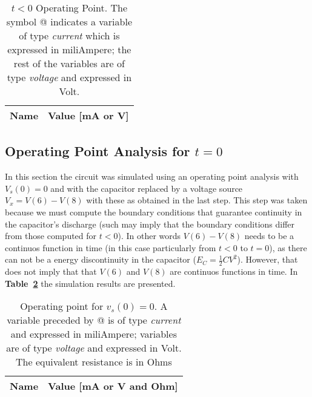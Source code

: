\begin{table}[h!]
  \centering
  \begin{tabular}{|l|r|}
    \hline    
    {\bf Name} & {\bf Value [mA or V]} \\ \hline
    
  \end{tabular}
  \caption{$t<0$ Operating Point. The symbol @ indicates a variable of type {\em current}
    which is expressed in miliAmpere; the rest of the variables are of type {\it voltage} and expressed in Volt.}
  \label{tab:op}
\end{table}

\pagebreak
\subsection{Operating Point Analysis for $t=0$}
In this section the circuit was simulated using an operating point analysis with $V_s(0) = 0$ and 
with the capacitor replaced by a voltage source {\it $V_x=V(6)-V(8)$} with these as obtained in the last step. This step was taken because we must compute the boundary conditions that guarantee continuity in the capacitor's discharge (such may imply that the boundary conditions differ from those computed for $t<0$). In other words $V(6)-V(8)$ needs to be a continuos function in time (in this case particularly from $t<0$ to $t=0$), as there can not be a energy discontinuity in the capacitor ($E_C=\frac{1}{2}CV^{2}$). However, that does not imply that that $V(6)$ and $V(8)$ are continuos functions in time.
In \textbf{Table~\ref{tab:opeq}} the simulation results are presented. 
\begin{table}[h!]
  \centering
  \begin{tabular}{|l|r|}
    \hline    
    {\bf Name} & {\bf Value [mA or V and Ohm]} \\ \hline
    
  \end{tabular} 
  \caption{Operating point for {\it $v_s(0)=0$}. A variable preceded by @ is of type {\em current}
    and expressed in miliAmpere; variables are of type {\it voltage} and expressed in
    Volt. The equivalent resistance is in Ohms}
  \label{tab:opeq}
\end{table}

\pagebreak
 

